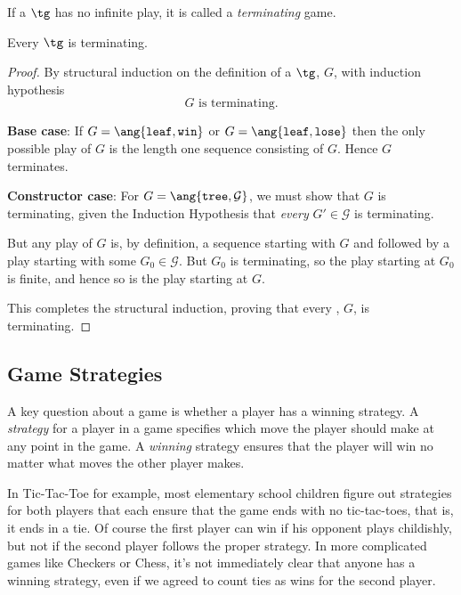 \begin{definition}
\begin{definition}
If a $\tg$ has no infinite play, it is called a \emph{terminating} game.
\end{definition}

\begin{theorem}
Every $\tg$ is terminating.
\end{theorem}

\begin{proof}
By structural induction on the definition of a $\tg$, $G$, with induction
hypothesis
\[
G \text{ is terminating}.
\]

\textbf{Base case}: If $G = \ang{\texttt{leaf}, \texttt{win}}$ or $G =
\ang{\texttt{leaf}, \texttt{lose}}$ then the only possible play of $G$ is
the length one sequence consisting of $G$.  Hence $G$ terminates.

\textbf{Constructor case}: For $G = \ang{\texttt{tree},\mathcal{G}}$, we
must show that $G$ is terminating, given the Induction Hypothesis that
\emph{every} $G' \in \mathcal{G}$ is terminating.

But any play of $G$ is, by definition, a sequence starting with $G$ and
followed by a play starting with some $G_0 \in \mathcal{G}$.  But $G_0$ is
terminating, so the play starting at $G_0$ is finite, and hence so is the
play starting at $G$.

This completes the structural induction, proving that every \tg, $G$, is
terminating.
\end{proof}


\subsection{Game Strategies}

A key question about a game is whether a player has a winning strategy.  A
\emph{strategy} for a player in a game specifies which move the player
should make at any point in the game.  A \emph{winning} strategy ensures
that the player will win no matter what moves the other player makes.

In Tic-Tac-Toe for example, most elementary school children figure out
strategies for both players that each ensure that the game ends with no
tic-tac-toes, that is, it ends in a tie.  Of course the first player can
win if his opponent plays childishly, but not if the second player follows
the proper strategy.  In more complicated games like Checkers or Chess,
it's not immediately clear that anyone has a winning strategy, even if we
agreed to count ties as wins for the second player.


\end{definition}
